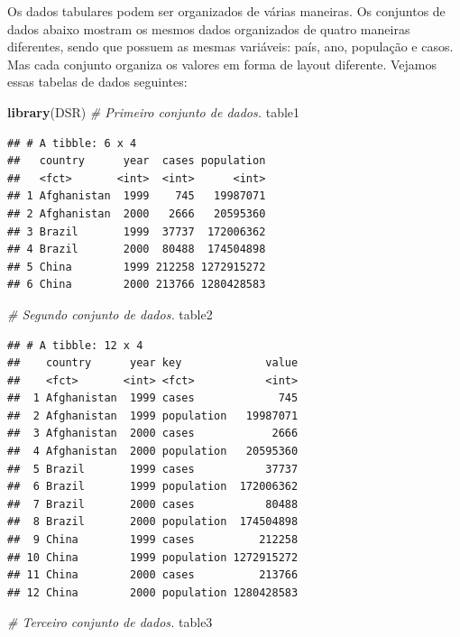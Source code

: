 \documentclass[]{book}
\newenvironment{Shaded}{\begin{snugshade}}{\end{snugshade}}
\newcommand{\CommentTok}[1]{\textcolor[rgb]{0.56,0.35,0.01}{\textit{#1}}}
\newcommand{\KeywordTok}[1]{\textcolor[rgb]{0.13,0.29,0.53}{\textbf{#1}}}
\newcommand{\NormalTok}[1]{#1}
\begin{document}
Os dados tabulares podem ser organizados de várias maneiras. Os conjuntos de dados abaixo mostram os mesmos dados organizados de quatro maneiras diferentes, sendo que possuem as mesmas variáveis: país, ano, população e casos. Mas cada conjunto organiza os valores em forma de layout diferente. Vejamos essas tabelas de dados seguintes:

\begin{Shaded}
\begin{Highlighting}[]
\KeywordTok{library}\NormalTok{(DSR)}
\CommentTok{# Primeiro conjunto de dados.}
\NormalTok{table1}
\end{Highlighting}
\end{Shaded}

\begin{verbatim}
## # A tibble: 6 x 4
##   country      year  cases population
##   <fct>       <int>  <int>      <int>
## 1 Afghanistan  1999    745   19987071
## 2 Afghanistan  2000   2666   20595360
## 3 Brazil       1999  37737  172006362
## 4 Brazil       2000  80488  174504898
## 5 China        1999 212258 1272915272
## 6 China        2000 213766 1280428583
\end{verbatim}

\begin{Shaded}
\begin{Highlighting}[]
\CommentTok{# Segundo conjunto de dados.}
\NormalTok{table2}
\end{Highlighting}
\end{Shaded}

\begin{verbatim}
## # A tibble: 12 x 4
##    country      year key             value
##    <fct>       <int> <fct>           <int>
##  1 Afghanistan  1999 cases             745
##  2 Afghanistan  1999 population   19987071
##  3 Afghanistan  2000 cases            2666
##  4 Afghanistan  2000 population   20595360
##  5 Brazil       1999 cases           37737
##  6 Brazil       1999 population  172006362
##  7 Brazil       2000 cases           80488
##  8 Brazil       2000 population  174504898
##  9 China        1999 cases          212258
## 10 China        1999 population 1272915272
## 11 China        2000 cases          213766
## 12 China        2000 population 1280428583
\end{verbatim}

\begin{Shaded}
\begin{Highlighting}[]
\CommentTok{# Terceiro conjunto de dados.}
\NormalTok{table3}
\end{Highlighting}
\end{Shaded}
\end{document}
